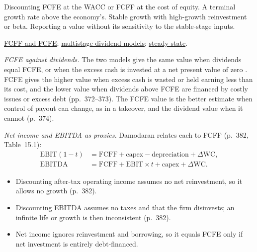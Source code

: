 \begin{qfmethod}
 Discounting FCFE at the WACC or FCFF at the cost of equity. A terminal growth rate above the economy's. Stable growth with high-growth reinvestment or beta. Reporting a value without its sensitivity to the stable-stage inputs.

 \hyperref[meth:fcff-fcfe-derivation]{FCFF and FCFE}; \hyperref[meth:multistage-ddm]{multistage dividend models}; \hyperref[meth:forecast-horizon-steady-state]{steady state}.

\end{qfmethod}

\begin{qfmethod}\label{meth:cash-flow-proxies}
 \emph{FCFE against dividends.} The two models give the same value when dividends equal FCFE, or when the excess cash is invested at a net present value of zero \citep[p.~372]{investment-valuation-2012}. FCFE gives the higher value when excess cash is wasted or held earning less than its cost, and the lower value when dividends above FCFE are financed by costly issues or excess debt (pp.~372--373). The FCFE value is the better estimate when control of payout can change, as in a takeover, and the dividend value when it cannot (p.~374).

\emph{Net income and EBITDA as proxies.} Damodaran relates each to FCFF (p.~382, Table~15.1):
\begin{align*}
\mathrm{EBIT}(1-t)&=\mathrm{FCFF}+\text{capex}-\text{depreciation}+\Delta\mathrm{WC},\\
\mathrm{EBITDA}&=\mathrm{FCFF}+\mathrm{EBIT}\times t+\text{capex}+\Delta\mathrm{WC}.
\end{align*}
\begin{itemize}
\item Discounting after-tax operating income assumes no net reinvestment, so it allows no growth (p.~382).
\item Discounting EBITDA assumes no taxes and that the firm disinvests; an infinite life or growth is then inconsistent (p.~382).
\item Net income ignores reinvestment and borrowing, so it equals FCFE only if net investment is entirely debt-financed.
\end{itemize}


\end{qfmethod}
